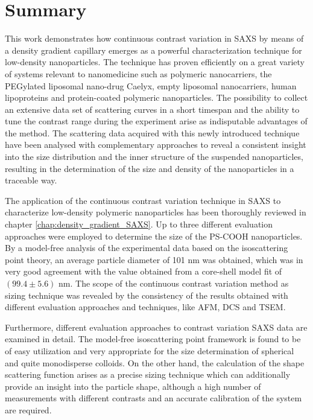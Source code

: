 \chapter{Summary} 
\label{chap:conclusions}
This work demonstrates how continuous contrast variation in SAXS by means of a density gradient capillary emerges as a powerful characterization technique for low-density nanoparticles. The technique has proven efficiently on a great variety of systems relevant to nanomedicine such as polymeric nanocarriers, the PEGylated liposomal nano-drug Caelyx, empty liposomal nanocarriers, human lipoproteins and protein-coated polymeric nanoparticles. The possibility to collect an extensive data set of scattering curves in a short timespan and the ability to tune the contrast range during the experiment arise as indisputable advantages of the method. The scattering data acquired with this newly introduced technique have been analysed with complementary approaches to reveal a consistent insight into the size distribution and the inner structure of the suspended nanoparticles, resulting in the determination of the size and density of the nanoparticles in a traceable way. 

The application of the continuous contrast variation technique in SAXS to characterize low-density polymeric nanoparticles has been thoroughly reviewed in chapter \ref{chap:density_gradient_SAXS}. Up to three different evaluation approaches were employed to determine the size of the PS-COOH nanoparticles. By a model-free analysis of the experimental data based on the isoscattering point theory, an average particle diameter of 101 nm was obtained, which was in very good agreement with the value obtained from a core-shell model fit of $\left( 99.4 \pm 5.6  \right)$ nm. The scope of the continuous contrast variation method as sizing technique was revealed by the consistency of the results obtained with different evaluation approaches and techniques, like AFM, DCS and TSEM.

Furthermore, different evaluation approaches to contrast variation SAXS data are examined in detail. The model-free isoscattering point framework is found to be of easy utilization and very appropriate for the size determination of spherical and quite monodisperse colloids. On the other hand, the calculation of the shape scattering function arises as a precise sizing technique which can additionally provide an insight into the particle shape, although a high number of measurements with different contrasts and an accurate calibration of the system are required.

